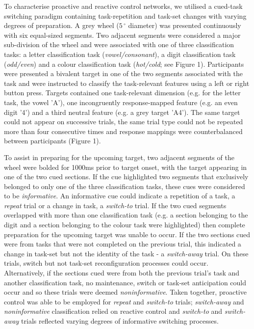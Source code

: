 \documentclass[preprint,authoryear,11pt,5p,times,twocolumns]{elsarticle}
\begin{document}
To characterise proactive and reactive control networks, we utilised a cued-task switching paradigm containing task-repetition and task-set changes with varying degrees of preparation. A grey wheel ($5\,^{\circ}$ diameter) was presented continuously with six equal-sized segments. Two adjacent segments were considered a major sub-division of the wheel and were associated with one of three classification tasks: a letter classification task (\textit{vowel/consonant}), a digit classification task (\textit{odd/even}) and a colour classification task (\textit{hot/cold}; see Figure 1). Participants were presented a bivalent target in one of the two segments associated with the task and were instructed to classify the task-relevant features using a left or right button press. Targets contained one task-relevant dimension (e.g. for the letter task, the vowel 'A'), one incongruently response-mapped feature (e.g. an even digit '4') and a third neutral feature (e.g. a grey target 'A4'). The same target could not appear on successive trials, the same trial type could not be repeated more than four consecutive times and response mappings were counterbalanced between participants (Figure 1).


To assist in preparing for the upcoming target, two adjacent segments of the wheel were bolded for 1000ms prior to target onset, with the target appearing in one of the two cued sections. If the cue highlighted two segments that exclusively belonged to only one of the three classification tasks, these cues were considered to be \textit{informative}. An informative cue could indicate a repetition of a task, a \textit{repeat} trial or a change in task, a \textit{switch-to} trial. If the two cued segments overlapped with more than one classification task (e.g. a section belonging to the digit and a section belonging to the colour task were highlighted) then complete preparation for the upcoming target was unable to occur. If the two sections cued were from tasks that were not completed on the previous trial, this indicated a change in task-set but not the identity of the task - a \textit{switch-away} trial. On these trials, switch but not task-set reconfiguration processes could occur. Alternatively, if the sections cued were from both the previous trial's task and another classification task, no maintenance, switch or task-set anticipation could occur and so these trials were deemed \textit{noninformative}. Taken together, proactive control was able to be employed for \textit{repeat} and \textit{switch-to} trials; \textit{switch-away} and \textit{noninformative} classification relied on reactive control and \textit{switch-to} and \textit{switch-away} trials reflected varying degrees of informative switching processes.
\end{document}
